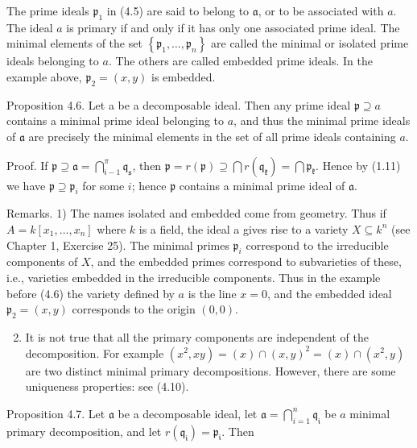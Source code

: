 \documentclass{standalone}
\theoremstyle{definition}
\theoremstyle{remark}
\begin{document}
The prime ideals $\mathfrak{p}_{1}$ in (4.5) are said to belong to
$\mathfrak{a}$, or to be associated with $a$. The ideal $a$ is primary if and
only if it has only one associated prime ideal. The minimal elements of the set
$\left\{\mathfrak{p}_{1}, \ldots, \mathfrak{p}_{n}\right\}$ are called the
minimal or isolated prime ideals belonging to $a$. The others are called
embedded prime ideals. In the example above, $\mathfrak{p}_{2}=(x, y)$ is
embedded.

Proposition 4.6. Let a be a decomposable ideal. Then any prime ideal
$\mathfrak{p} \supseteq a$ contains a minimal prime ideal belonging to $a$, and
thus the minimal prime ideals of $\mathfrak{a}$ are precisely the minimal
elements in the set of all prime ideals containing $a$.

Proof. If $\mathfrak{p} \supseteq \mathfrak{a}=\bigcap_{\mathfrak{i}-1}^{\pi}
\mathfrak{q}_{\mathfrak{s}}$, then $\mathfrak{p}=r(\mathfrak{p}) \supseteq
\bigcap r\left(\mathfrak{q}_{\mathfrak{k}}\right)=\bigcap
\mathfrak{p}_{\mathfrak{k}}$. Hence by (1.11) we have $\mathfrak{p} \supseteq
\mathfrak{p}_{i}$ for some $i$; hence $\mathfrak{p}$ contains a minimal prime
ideal of $\mathfrak{a}$.

Remarks. 1) The names isolated and embedded come from geometry. Thus if
$A=k\left[x_{1}, \ldots, x_{n}\right]$ where $k$ is a field, the ideal a gives
rise to a variety $X \subseteq k^{n}$ (see Chapter 1, Exercise 25). The minimal
primes $\mathfrak{p}_{i}$ correspond to the irreducible components of $X$, and
the embedded primes correspond to subvarieties of these, i.e., varieties
embedded in the irreducible components. Thus in the example before (4.6) the
variety defined by $a$ is the line $x=0$, and the embedded ideal
$\mathfrak{p}_{2}=(x, y)$ corresponds to the origin $(0,0)$.

\begin{enumerate}
  \setcounter{enumi}{1}
  \item It is not true that all the primary components are independent of the
  decomposition. For example $\left(x^{2}, x y\right)=(x) \cap(x, y)^{2}=(x)
  \cap\left(x^{2}, y\right)$ are two distinct minimal primary decompositions.
  However, there are some uniqueness properties: see (4.10).
\end{enumerate}

Proposition 4.7. Let $\mathfrak{a}$ be a decomposable ideal, let
$\mathfrak{a}=\bigcap_{i=1}^{n} \mathfrak{q}_{\mathfrak{i}}$ be $a$ minimal
primary decomposition, and let
$r\left(\mathfrak{q}_{\mathfrak{i}}\right)=\mathfrak{p}_{\mathfrak{i}}$. Then
\end{document}
